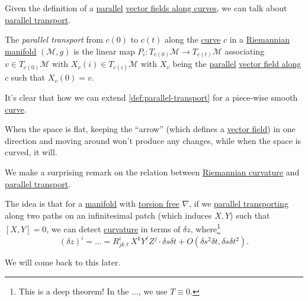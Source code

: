Given the definition of a \hyperref[def:parallel]{parallel} \hyperref[def:vector-field-along-curve]{vector fields along curves}, we can talk about \hyperref[def:parallel-transport]{parallel transport}.

\begin{definition}\label{def:parallel-transport}
	The \emph{parallel transport} from \(c(0)\) to \(c(t)\) along the \hyperref[def:curve]{curve} \(c\) in a \hyperref[def:Riemannian-manifold]{Riemannian manifold} \((\mathcal{M} , g)\) is the linear map \(P_i \colon T_{c(0)} \mathcal{M} \to T_{c(t) }\mathcal{M} \) associating \(v\in T_{c(0)} \mathcal{M} \) with \(X_v(i)\in T_{c(i)}\mathcal{M} \) with \(X_v\) being the \hyperref[def:parallel]{parallel} \hyperref[def:vector-field-along-curve]{vector field along \(c\)} such that \(X_v (0) = v\).
\end{definition}

It's clear that how we can extend \autoref{def:parallel-transport} for a piece-wise smooth \hyperref[def:curve]{curve}.

\begin{intuition}
	When the space is flat, keeping the ``arrow'' (which defines a \hyperref[def:vector-field]{vector field}) in one direction and moving around won't produce any changes, while when the space is curved, it will.
	\begin{center}
	\end{center}
\end{intuition}

We make a surprising remark on the relation between \hyperref[def:Riemannian-curvature]{Riemannian curvature} and \hyperref[def:parallel-transport]{parallel transport}.

\begin{remark}
	The idea is that for a \hyperref[def:smooth-manifold]{manifold} with \hyperref[def:torsion-free]{torsion free} \(\nabla \), if we \hyperref[def:parallel-transport]{parallel transporting} along two paths on an infinitesimal patch (which induces \(X, Y\)) such that \([X, Y]=0\), we can detect \hyperref[def:Riemannian-curvature]{curvature} in terms of \(\delta z\), where\footnote{This is a deep theorem! In the \(\dots \), we use \(T \equiv 0\).}
	\[
		(\delta z)^i = \dots = R^i_{jk \ell } X^k Y^{\ell} Z^j\cdot \delta s \delta t + O(\delta s^2 \delta t, \delta s \delta t^2).
	\]
	\begin{center}
	\end{center}
	We will come back to this later.
\end{remark}

